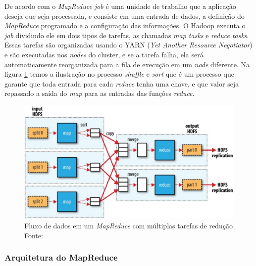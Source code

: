             De acordo com  o \textit{MapReduce job} é uma unidade de trabalho que a
            aplicação deseja que seja processada, e consiste em uma entrada de dados, a definição do
            \textit{MapReduce} programado e a configuração das informações. O Hadoop executa o \textit{job}
            dividindo ele em dois tipos de tarefas, as chamadas \textit{map tasks} e \textit{reduce tasks}.
            Essas tarefas são organizadas usando o YARN (\textit{Yet Another Resource Negotiator}) e são
            executadas nos \textit{nodes} do cluster, e se a tarefa falha, ela será automaticamente reorganizada
            para a fila de execução em um \textit{node} diferente. Na figura \ref{figura5} temos a ilustração no
            processo \textit{shuffle} e \textit{sort}  que é um processo que garante que toda entrada para cada
            \textit{reduce} tenha uma chave, e que valor seja repassado a saída do \textit{map} para as
            entradas das funções \textit{reduce}\cite{white2015}.

            \begin{figure}[ht!]
                    \centering
                    \includegraphics[keepaspectratio=true,scale=0.75]
                        {figuras/figura5.eps}
                    \caption[Fluxo de dados em um \textit{MapReduce} com múltiplas tarefas de redução]
                    {Fluxo de dados em um \textit{MapReduce} com múltiplas tarefas de redução
                    \protect \linebreak Fonte: }
                    \label{figura5}
            \end{figure}

            \subsubsection{Arquitetura do MapReduce}

